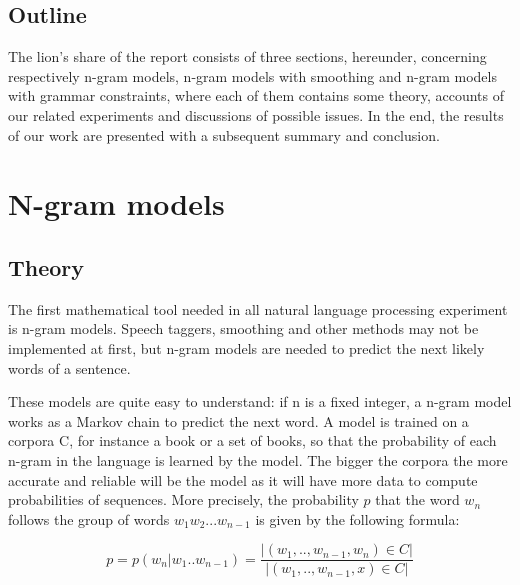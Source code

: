 \documentclass[a4paper,12pt]{article}
\begin{document}
\subsection{Outline}
The lion's share of the report consists of three sections, hereunder, concerning respectively n-gram models, n-gram models with smoothing and n-gram models with grammar constraints, where each of them contains some theory, accounts of our related experiments and discussions of possible issues. In the end, the results of our work are presented with a subsequent summary and conclusion.

\section{N-gram models}
\label{sec:ngram}

\subsection{Theory}
The first mathematical tool needed in all natural language processing experiment is n-gram models. Speech taggers, smoothing and other methods may not be implemented at first, but n-gram models are needed to predict the next likely words of a sentence.

These models are quite easy to understand: if n is a fixed integer, a n-gram model works as a Markov chain to predict the next word. A model is trained on a corpora C, for instance a book or a set of books, so that the probability of each n-gram in the language is learned by the model. The bigger the corpora the more accurate and reliable will be the model as it will have more data to compute probabilities of sequences. More precisely, the probability $p$ that the word $w_n$ follows the group of words $w_1 w_2 ... w_{n-1}$ is given by the following formula:

$$ p = p(w_n | w_1 .. w_{n-1}) = \frac{|{(w_1, .., w_{n-1}, w_n) \in C}|}{|{(w_1, .., w_{n-1}, x) \in C}|} $$
\end{document}
